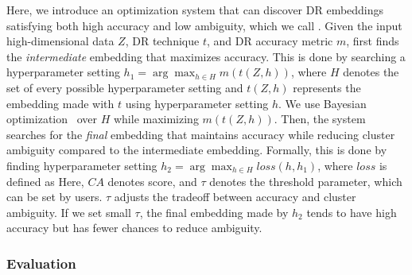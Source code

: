 Here, we introduce an optimization system that can discover DR embeddings satisfying both high accuracy and low ambiguity, which we call \ambreducer. Given the input high-dimensional data $Z$, DR technique $t$, and DR accuracy metric $m$, \ambreducer first finds the \textit{intermediate} embedding that maximizes accuracy.
This is done by searching a hyperparameter setting $h_1 = \arg\max_{h\in H}{m(t(Z, h))}$, where $H$ denotes the set of every possible hyperparameter setting and $t(Z, h)$ represents the embedding made with $t$ using hyperparameter setting $h$. We use Bayesian optimization~\cite{snoek12nips} over $H$ while maximizing $m(t(Z, h))$. Then, the system searches for the \textit{final} embedding that maintains accuracy while reducing cluster ambiguity compared to the intermediate embedding. 
Formally, this is done by finding hyperparameter setting $h_2 = \arg\max_{h\in H}{loss(h, h_1)}$, where $loss$ is defined as
Here, $CA$ denotes \measure score, and $\tau$ denotes the threshold parameter, which can be set by users. $\tau$ adjusts the tradeoff between accuracy and cluster ambiguity. If we set small $\tau$, the final embedding made by $h_2$ tends to have high accuracy but has fewer chances to reduce ambiguity. 

\subsubsection{Evaluation}


\label{sec:ar_eval}


